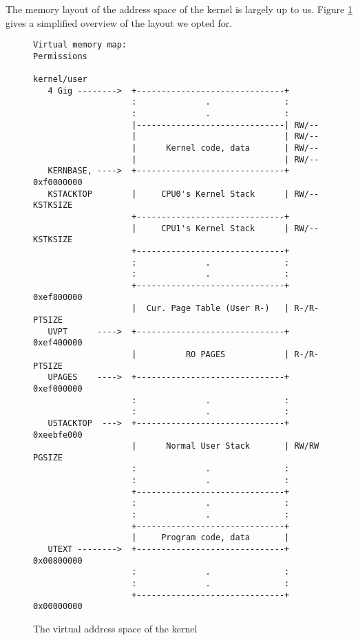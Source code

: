 \documentclass{report}
\begin{document}
The memory layout of the address space of the kernel is largely up to us.
Figure \ref{memlayout} gives a simplified overview of the layout we opted for.
\begin{figure}
\begin{framed}
\begin{Verbatim}[fontsize=\small]
Virtual memory map:                                  Permissions
                                                     kernel/user
   4 Gig -------->  +------------------------------+
                    :              .               :
                    :              .               :
                    |------------------------------| RW/--
                    |                              | RW/--
                    |      Kernel code, data       | RW/--
                    |                              | RW/--
   KERNBASE, ---->  +------------------------------+ 0xf0000000      
   KSTACKTOP        |     CPU0's Kernel Stack      | RW/--  KSTKSIZE 
                    +------------------------------+                 
                    |     CPU1's Kernel Stack      | RW/--  KSTKSIZE 
                    +------------------------------+                 
                    :              .               :                 
                    :              .               :                 
                    +------------------------------+ 0xef800000
                    |  Cur. Page Table (User R-)   | R-/R-  PTSIZE
   UVPT      ---->  +------------------------------+ 0xef400000
                    |          RO PAGES            | R-/R-  PTSIZE
   UPAGES    ---->  +------------------------------+ 0xef000000
                    :              .               :                 
                    :              .               :                 
   USTACKTOP  --->  +------------------------------+ 0xeebfe000
                    |      Normal User Stack       | RW/RW  PGSIZE
                    :              .               :                 
                    :              .               :                 
                    +------------------------------+
                    :              .               :
                    :              .               :
                    +------------------------------+
                    |     Program code, data       |
   UTEXT -------->  +------------------------------+ 0x00800000
                    :              .               :                 
                    :              .               :                 
                    +------------------------------+ 0x00000000
\end{Verbatim}
\end{framed}
\caption{The virtual address space of the kernel}
\label{memlayout}
\end{figure}
\end{document}
